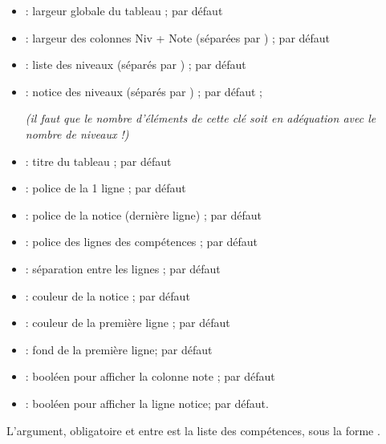 \documentclass[french,11pt,a4paper]{article}
\begin{document}
\begin{itemize}
	\item {} : largeur globale du tableau ;  par défaut
	\item {} : largeur des colonnes Niv + Note (séparées par ) ;  par défaut
	\item {} : liste des niveaux (séparés par ) ;  par défaut
	\item {} : notice des niveaux (séparés par ) ;  par défaut ;
	
	\textit{(il faut que le nombre d'éléments de cette clé soit en adéquation avec le nombre de niveaux !)}
	\item {} : titre du tableau ;  par défaut
	\item {} : police de la 1 ligne ;  par défaut
	\item {} : police de la notice (dernière ligne) ;  par défaut
	\item {} : police des lignes des compétences ;  par défaut
	\item {} : séparation entre les lignes ; \MontreCode{2pt} par défaut
	\item {} : couleur de la notice ;  par défaut
	\item {} : couleur de la première ligne ;  par défaut
	\item {} : fond de la première ligne;  par défaut
	\item {} : booléen pour afficher la colonne note ;  par défaut
	\item {} : booléen pour afficher la ligne notice;  par défaut.
\end{itemize}

L'argument, obligatoire et entre  est la liste des compétences, sous la forme .
\end{document}
